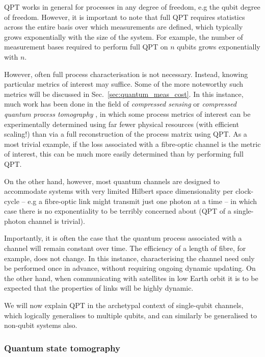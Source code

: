 \documentclass[aps, rmp, twocolumn, amsmath, amssymb, nofootinbib, superscriptaddress, longbibliography, floatfix, table-of-contents, eqsecnum]{revtex4-1}
\begin{document}
QPT works in general for processes in any degree of freedom, e.g the qubit degree of freedom. However, it is important to note that full QPT requires statistics across the entire basis over which measurements are defined, which typically grows exponentially with the size of the system. For example, the number of measurement bases required to perform full QPT on $n$ qubits grows exponentially with $n$.

However, often full process characterisation is not necessary. Instead, knowing particular metrics of interest may suffice. Some of the more noteworthy such metrics will be discussed in Sec.~\ref{sec:quantum_meas_cost}. In this instance, much work has been done in the field of \textit{compressed sensing} or \textit{compressed quantum process tomography} \cite{???,compressed_sensing}, in which some process metrics of interest can be experimentally determined using far fewer physical resources (with efficient scaling!) than via a full reconstruction of the process matrix using QPT. As a most trivial example, if the loss associated with a fibre-optic channel is the metric of interest, this can be much more easily determined than by performing full QPT.

On the other hand, however, most quantum channels are designed to accommodate systems with very limited Hilbert space dimensionality per clock-cycle -- e.g a fibre-optic link might transmit just one photon at a time -- in which case there is no exponentiality to be terribly concerned about (QPT of a single-photon channel is trivial).

Importantly, it is often the case that the quantum process associated with a channel will remain constant over time. The efficiency of a length of fibre, for example, does not change. In this instance, characterising the channel need only be performed once in advance, without requiring ongoing dynamic updating. On the other hand, when communicating with satellites in low Earth orbit it is to be expected that the properties of links will be highly dynamic.

We will now explain QPT in the archetypal context of single-qubit channels, which logically generalises to multiple qubits, and can similarly be generalised to non-qubit systems also.

%
%

\subsubsection{Quantum state tomography} 
\end{document}
